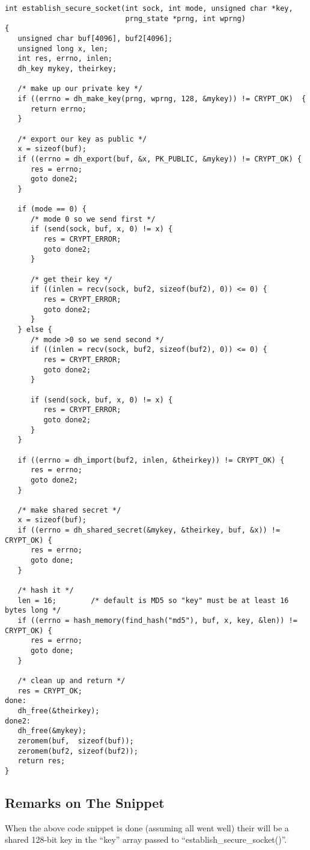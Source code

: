 \documentclass{book}
\begin{document}
\begin{small}
\begin{verbatim}
int establish_secure_socket(int sock, int mode, unsigned char *key, 
                            prng_state *prng, int wprng)
{
   unsigned char buf[4096], buf2[4096];
   unsigned long x, len;
   int res, errno, inlen;
   dh_key mykey, theirkey;

   /* make up our private key */
   if ((errno = dh_make_key(prng, wprng, 128, &mykey)) != CRYPT_OK)  {
      return errno;
   }

   /* export our key as public */ 
   x = sizeof(buf);
   if ((errno = dh_export(buf, &x, PK_PUBLIC, &mykey)) != CRYPT_OK) {
      res = errno;
      goto done2;
   }

   if (mode == 0) {
      /* mode 0 so we send first */
      if (send(sock, buf, x, 0) != x) {
         res = CRYPT_ERROR;
         goto done2;
      }          

      /* get their key */
      if ((inlen = recv(sock, buf2, sizeof(buf2), 0)) <= 0) {
         res = CRYPT_ERROR;
         goto done2;
      }
   } else {
      /* mode >0 so we send second */
      if ((inlen = recv(sock, buf2, sizeof(buf2), 0)) <= 0) {
         res = CRYPT_ERROR;
         goto done2;
      }

      if (send(sock, buf, x, 0) != x) {
         res = CRYPT_ERROR;
         goto done2;
      }
   }

   if ((errno = dh_import(buf2, inlen, &theirkey)) != CRYPT_OK) { 
      res = errno;
      goto done2;
   }

   /* make shared secret */
   x = sizeof(buf);
   if ((errno = dh_shared_secret(&mykey, &theirkey, buf, &x)) != CRYPT_OK) {
      res = errno;
      goto done;
   }
 
   /* hash it */
   len = 16;        /* default is MD5 so "key" must be at least 16 bytes long */
   if ((errno = hash_memory(find_hash("md5"), buf, x, key, &len)) != CRYPT_OK) {
      res = errno;
      goto done;
   }

   /* clean up and return */
   res = CRYPT_OK;
done:
   dh_free(&theirkey);
done2:
   dh_free(&mykey);
   zeromem(buf,  sizeof(buf));
   zeromem(buf2, sizeof(buf2));
   return res;
}
\end{verbatim}
\end{small}
\newpage
\subsection{Remarks on The Snippet}
When the above code snippet is done (assuming all went well) their will be a shared 128-bit key in the ``key'' array
passed to ``establish\_secure\_socket()''.
\end{document}
